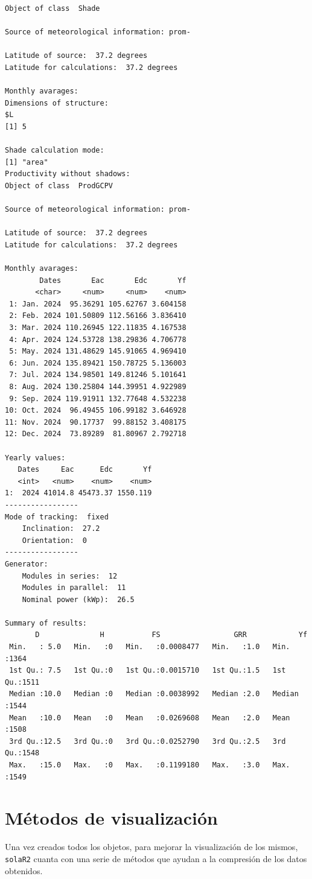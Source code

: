 \begin{verbatim}
Object of class  Shade 

Source of meteorological information: prom- 

Latitude of source:  37.2 degrees
Latitude for calculations:  37.2 degrees

Monthly avarages:
Dimensions of structure:
$L
[1] 5

Shade calculation mode:
[1] "area"
Productivity without shadows:
Object of class  ProdGCPV 

Source of meteorological information: prom- 

Latitude of source:  37.2 degrees
Latitude for calculations:  37.2 degrees

Monthly avarages:
        Dates       Eac       Edc       Yf
       <char>     <num>     <num>    <num>
 1: Jan. 2024  95.36291 105.62767 3.604158
 2: Feb. 2024 101.50809 112.56166 3.836410
 3: Mar. 2024 110.26945 122.11835 4.167538
 4: Apr. 2024 124.53728 138.29836 4.706778
 5: May. 2024 131.48629 145.91065 4.969410
 6: Jun. 2024 135.89421 150.78725 5.136003
 7: Jul. 2024 134.98501 149.81246 5.101641
 8: Aug. 2024 130.25804 144.39951 4.922989
 9: Sep. 2024 119.91911 132.77648 4.532238
10: Oct. 2024  96.49455 106.99182 3.646928
11: Nov. 2024  90.17737  99.88152 3.408175
12: Dec. 2024  73.89289  81.80967 2.792718

Yearly values:
   Dates     Eac      Edc       Yf
   <int>   <num>    <num>    <num>
1:  2024 41014.8 45473.37 1550.119
-----------------
Mode of tracking:  fixed 
    Inclination:  27.2 
    Orientation:  0 
-----------------
Generator:
    Modules in series:  12 
    Modules in parallel:  11 
    Nominal power (kWp):  26.5 

Summary of results:
       D              H           FS                 GRR            Yf      
 Min.   : 5.0   Min.   :0   Min.   :0.0008477   Min.   :1.0   Min.   :1364  
 1st Qu.: 7.5   1st Qu.:0   1st Qu.:0.0015710   1st Qu.:1.5   1st Qu.:1511  
 Median :10.0   Median :0   Median :0.0038992   Median :2.0   Median :1544  
 Mean   :10.0   Mean   :0   Mean   :0.0269608   Mean   :2.0   Mean   :1508  
 3rd Qu.:12.5   3rd Qu.:0   3rd Qu.:0.0252790   3rd Qu.:2.5   3rd Qu.:1548  
 Max.   :15.0   Max.   :0   Max.   :0.1199180   Max.   :3.0   Max.   :1549
\end{verbatim}

\section{Métodos de visualización}
\label{sec:orgf940128}
\label{sec:metodos-visualizacion}
Una vez creados todos los objetos, para mejorar la visualización de los mismos, \texttt{solaR2} cuanta con una serie de métodos que ayudan a la compresión de los datos obtenidos.


